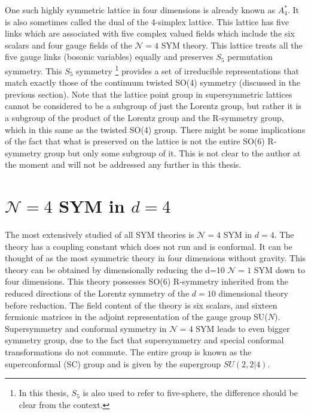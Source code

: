 One such highly symmetric lattice in four dimensions is already known as $A_{4}^{*}$. 
It is also sometimes called the dual of the 4-simplex lattice.
This lattice has five links which are associated with five complex valued fields which include the six scalars and four gauge 
fields of the $\mathcal{N}=4$ SYM theory. This lattice treats all the five gauge links (bosonic variables) equally 
and preserves $S_{5}$ permutation symmetry. This $S_{5}$ symmetry \footnote{In this thesis, $S_{5}$
is also used to refer to five-sphere, the difference should be clear from the context.} provides a set of irreducible representations 
that match exactly those of the continuum twisted SO(4) symmetry (discussed in the previous section). Note that the 
lattice point group in supersymmetric lattices cannot be considered to be a subgroup of just the Lorentz group, 
but rather it is a subgroup of the product of the Lorentz group and the R-symmetry group, which in this same as the 
twisted SO(4) group. There might be some implications of the fact that what is preserved on the lattice is not 
the entire SO(6) R-symmetry group but only some subgroup of it. This is not clear to the author at the moment 
and will not be addressed any further in this thesis. 

\section{$\mathcal{N} = 4 $ SYM in $d=4$}

The most extensively studied of all SYM theories is $\mathcal{N} = 4 $ SYM in $d=4$. 
The theory has a coupling constant which does not run and is conformal. 
It can be thought of as the most symmetric theory in four dimensions without gravity. 
This theory can be obtained by dimensionally reducing the d=10 $\mathcal{N} = 1 $ SYM down to 
four dimensions. This theory possesses SO(6) R-symmetry inherited from the reduced directions of the Lorentz symmetry of 
the $d=10$ dimensional theory before reduction. The field content of the theory is six scalars, 
and sixteen fermionic matrices in the adjoint representation of the gauge group SU($N$).  
Supersymmetry and conformal symmetry in $\mathcal{N} = 4 $ SYM leads
to even bigger symmetry group, due to the fact that supersymmetry and
special conformal transformations do not commute. 
The entire group is known as the superconformal (SC) group and is given by
the supergroup $SU(2, 2|4)$. 

